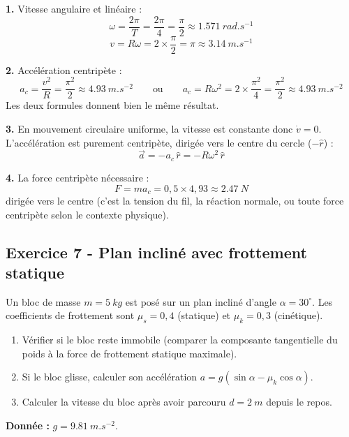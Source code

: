 \documentclass[12pt,a4paper]{article}
\begin{document}
\begin{boitecorrige}
\textbf{1.} Vitesse angulaire et linéaire :
\[
\omega = \frac{2\pi}{T} = \frac{2\pi}{4} = \frac{\pi}{2} \approx \qty{1.571}{rad.s^{-1}}
\]
\[
v = R\omega = 2 \times \frac{\pi}{2} = \pi \approx \qty{3.14}{m.s^{-1}}
\]

\textbf{2.} Accélération centripète :
\[
a_c = \frac{v^2}{R} = \frac{\pi^2}{2} \approx \qty{4.93}{m.s^{-2}} \qquad \text{ou} \qquad a_c = R\omega^2 = 2\times\frac{\pi^2}{4} = \frac{\pi^2}{2} \approx \qty{4.93}{m.s^{-2}}
\]
Les deux formules donnent bien le même résultat.

\textbf{3.} En mouvement circulaire uniforme, la vitesse est constante donc $\dot{v} = 0$. L'accélération est purement centripète, dirigée vers le centre du cercle ($-\hat{r}$) :
\[
\vec{a} = -a_c\,\hat{r} = -R\omega^2\,\hat{r}
\]

\textbf{4.} La force centripète nécessaire :
\[
F = ma_c = 0{,}5 \times 4{,}93 \approx \qty{2.47}{N}
\]
dirigée vers le centre (c'est la tension du fil, la réaction normale, ou toute force centripète selon le contexte physique).
\end{boitecorrige}

\subsection*{Exercice 7 - Plan incliné avec frottement statique \niveau{\moyen}}

\begin{boiteexercice}
Un bloc de masse $m = \qty{5}{kg}$ est posé sur un plan incliné d'angle $\alpha = 30^\circ $. Les coefficients de frottement sont $\mu_s = 0{,}4$ (statique) et $\mu_k = 0{,}3$ (cinétique).
\begin{enumerate}
  \item Vérifier si le bloc reste immobile (comparer la composante tangentielle du poids à la force de frottement statique maximale).
  \item Si le bloc glisse, calculer son accélération $a = g(\sin\alpha - \mu_k\cos\alpha)$.
  \item Calculer la vitesse du bloc après avoir parcouru $d = \qty{2}{m}$ depuis le repos.
\end{enumerate}
\textbf{Donnée :} $g = \qty{9.81}{m.s^{-2}}$.
\end{boiteexercice}
\end{document}
